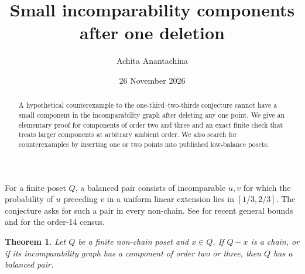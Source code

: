 \documentclass[10pt]{article}
\title{Small incomparability components after one deletion}
\author{Achita Anantachina}
\date{26 November 2026}
\newtheorem{theorem}{Theorem}
\begin{document}
\maketitle

\begin{abstract}
A hypothetical counterexample to the one-third--two-thirds conjecture
cannot have a small component in the incomparability graph after deleting
any one point. We give an elementary proof for components of order two and
three and an exact finite check that treats larger components at arbitrary
ambient order. We also search for counterexamples by inserting one or two
points into published low-balance posets.
\end{abstract}

For a finite poset \(Q\), a balanced pair consists of incomparable
\(u,v\) for which the probability of \(u\) preceding \(v\) in a uniform
linear extension lies in \([1/3,2/3]\). The conjecture asks for such a
pair in every non-chain. See \cite{acpp} for recent general bounds
and \cite{gupta} for the order-14 census.

\begin{theorem}\label{thm:small}
Let \(Q\) be a finite non-chain poset and \(x\in Q\). If \(Q-x\) is a chain,
or if its incomparability graph has a component of order two or three,
then \(Q\) has a balanced pair.
\end{theorem}
\end{document}

